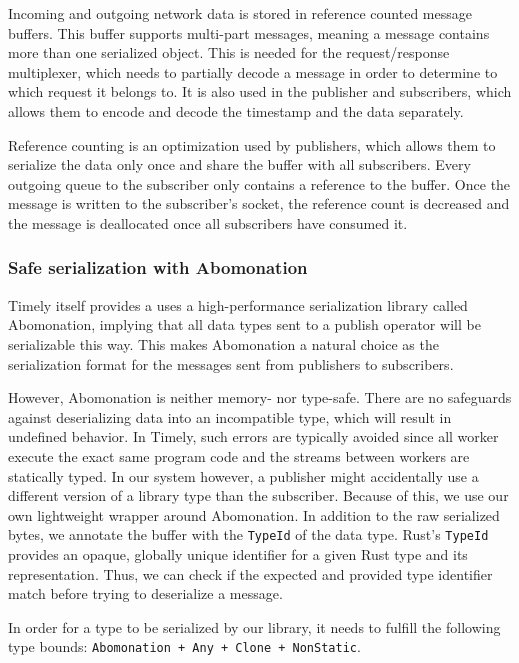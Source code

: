 Incoming and outgoing network data is stored in reference counted message buffers.
This buffer supports multi-part messages, meaning a message contains more than
one serialized object. This is needed for the request/response multiplexer, which
needs to partially decode a message in order to determine to which request it
belongs to. It is also used in the publisher and subscribers, which allows them
to encode and decode the timestamp and the data separately.

Reference counting is an optimization used by publishers, which allows them to
serialize the data only once and share the buffer with all subscribers. Every
outgoing queue to the subscriber only contains a reference to the buffer. Once
the message is written to the subscriber's socket, the reference count is
decreased and the message is deallocated once all subscribers have consumed it.

\subsubsection{Safe serialization with Abomonation}

Timely itself provides a uses a high-performance serialization library called
Abomonation, implying that all data types sent to a publish operator will be
serializable this way. This makes Abomonation a natural choice as the serialization
format for the messages sent from publishers to subscribers. 

However, Abomonation is neither memory- nor type-safe. There are no safeguards
against deserializing data into an incompatible type, which will result in undefined
behavior. In Timely, such errors are typically avoided since all worker
execute the exact same program code and the streams between workers are
statically typed. In our system however, a publisher might accidentally use
a different version of a library type than the subscriber. Because of this,
we use our own lightweight wrapper around Abomonation. In addition to the raw
serialized bytes, we annotate the buffer with the \lstinline{TypeId} of the
data type. Rust's \lstinline{TypeId} provides an opaque, globally unique
identifier for a given Rust type and its representation. Thus, we can check
if the expected and provided type identifier match before trying to deserialize
a message.

In order for a type to be serialized by our library, it needs to fulfill the
following type bounds: \lstinline{Abomonation + Any + Clone + NonStatic}.

